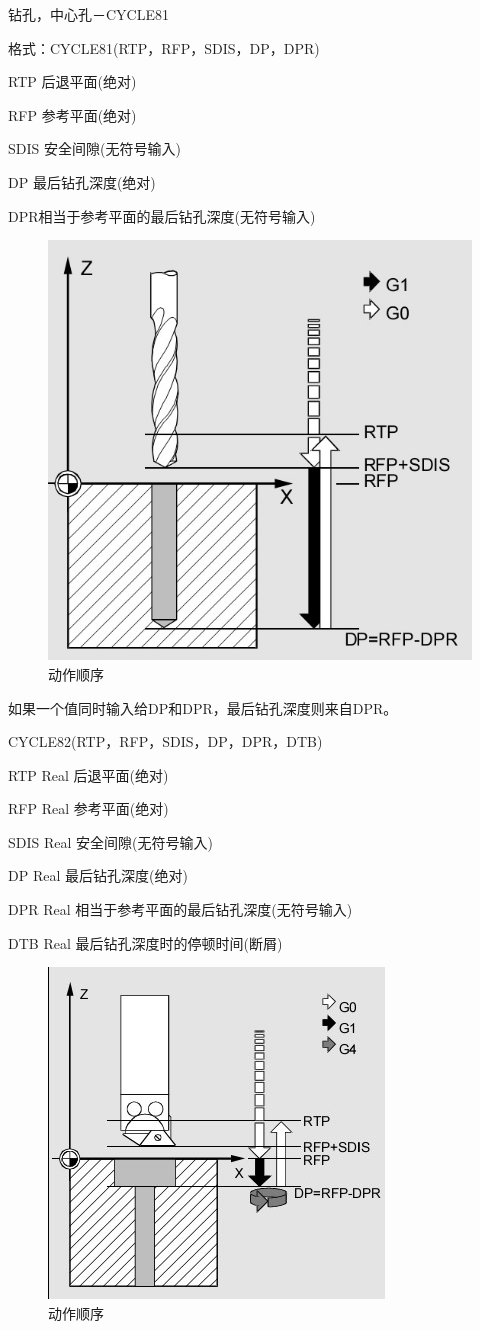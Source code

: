 钻孔，中心孔－CYCLE81

格式：CYCLE81(RTP，RFP，SDIS，DP，DPR)

RTP 后退平面(绝对) 

RFP 参考平面(绝对) 

SDIS 安全间隙(无符号输入) 

DP 最后钻孔深度(绝对) 

DPR相当于参考平面的最后钻孔深度(无符号输入)

\begin{figure}[h]
	\centering
	\includegraphics[width=0.7\linewidth]{data/image/23-1}
	\caption{动作顺序}
	\label{fig:23-1}
\end{figure}

如果一个值同时输入给DP和DPR，最后钻孔深度则来自DPR。

CYCLE82(RTP，RFP，SDIS，DP，DPR，DTB)

RTP Real 后退平面(绝对)

RFP Real 参考平面(绝对) 

SDIS Real 安全间隙(无符号输入) 

DP Real 最后钻孔深度(绝对)
 
DPR Real 相当于参考平面的最后钻孔深度(无符号输入) 

DTB Real 最后钻孔深度时的停顿时间(断屑)

\begin{figure}[h]
	\centering
	\includegraphics[width=0.7\linewidth]{data/image/23-2}
	\caption{动作顺序}
	\label{fig:23-2}
\end{figure}

